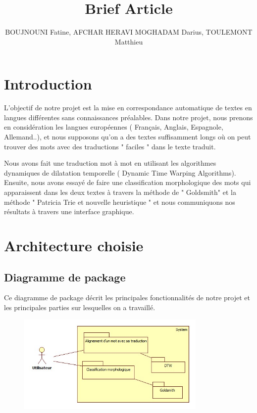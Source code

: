 \documentclass[11pt, oneside]{article}   	%
\title{Brief Article}
\author{BOUJNOUNI Fatine, AFCHAR HERAVI MOGHADAM Darius, TOULEMONT Matthieu}
\begin{document}
\maketitle
\section{Introduction}
L'objectif de notre projet est la mise en correspondance automatique de textes en langues différentes sans connaissances préalables. Dans notre projet, nous prenons en considération les langues européennes ( Français, Anglais, Espagnole, Allemand..), et nous supposons qu'on a des textes suffisamment longs où on peut trouver des mots avec des traductions " faciles " dans le texte traduit.

Nous avons fait une traduction mot à mot en utilisant les algorithmes dynamiques de dilatation temporelle ( Dynamic Time Warping Algorithms).
Ensuite, nous avons essayé de faire une classification morphologique des mots qui apparaissent dans les deux textes à travers la méthode de " Goldsmith" et la méthode " Patricia Trie et nouvelle heuristique " et nous communiquons nos résultats à travers une interface graphique.


\section{Architecture choisie}
\subsection{Diagramme de package}
Ce diagramme de package décrit les principales fonctionnalités de notre projet et les principales parties sur lesquelles on a travaillé.
\begin{figure}[h!]
\centering
\includegraphics[width = 260pt]{diag_pack.jpg}
\end{figure}
\end{document}
